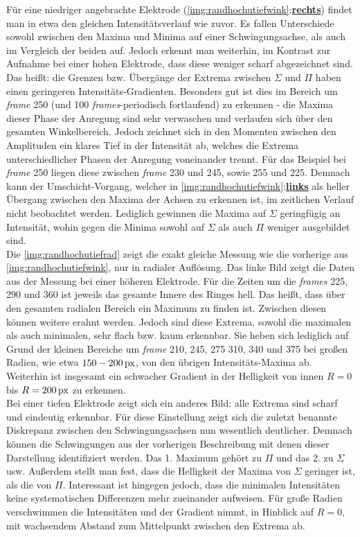 \documentclass[numbers=noenddot,a4paper,notitlepage,twoside,BCOR15mm]{scrbook}
\newcommand{\tilt}[1]{\textit{#1}}
\newcommand{\fett}[1]{\textbf{#1}}
\begin{document}
			Für eine niedriger angebrachte Elektrode (\autoref{img:randhochutiefwink}:\underline{\fett{rechts}}) findet man in etwa den gleichen Intensitätsverlauf wie zuvor. Es fallen Unterschiede sowohl zwischen den Maxima und Minima auf einer Schwingungsachse, als auch im Vergleich der beiden auf. Jedoch erkennt man weiterhin, im Kontrast zur Aufnahme bei einer hohen Elektrode, dass diese weniger scharf abgezeichnet sind. Das heißt: die Grenzen bzw. Übergänge der Extrema zwischen $\Sigma$ und $\Pi$ haben einen geringeren Intensitäts-Gradienten. Besonders gut ist dies im Bereich um \tilt{frame} 250 (und 100 \tilt{frames}-periodisch fortlaufend) zu erkennen - die Maxima dieser Phase der Anregung sind sehr verwaschen und verlaufen sich über den gesamten Winkelbereich. Jedoch zeichnet sich in den Momenten zwischen den Amplituden ein klares Tief in der Intensität ab, welches die Extrema unterschiedlicher Phasen der Anregung voneinander trennt. Für das Beispiel bei  \tilt{frame} 250 liegen diese zwischen \tilt{frame} 230 und 245, sowie 255 und 225. Demnach kann der Umschicht-Vorgang, welcher in \autoref{img:randhochutiefwink}:\underline{\fett{links}} als heller Übergang zwischen den Maxima der Achsen zu erkennen ist, im zeitlichen Verlauf nicht beobachtet werden. Lediglich gewinnen die Maxima auf $\Sigma$ geringfügig an Intensität, wohin gegen die Minima sowohl auf $\Sigma$ als auch $\Pi$ weniger ausgebildet sind.\\
			Die \autoref{img:randhochutiefrad} zeigt die exakt gleiche Messung wie die vorherige aus \autoref{img:randhochutiefwink}, nur in radialer Auflösung. Das linke Bild zeigt die Daten aus der Messung bei einer höheren Elektrode. Für die Zeiten um die \tilt{frames} 225, 290 und 360 ist jeweils das gesamte Innere des Ringes hell. Das heißt, dass über den gesamten radialen Bereich ein Maximum zu finden ist. Zwischen diesen können weitere erahnt werden. Jedoch sind diese Extrema, sowohl die maximalen als auch minimalen, sehr flach bzw. kaum erkennbar. Sie heben sich lediglich auf Grund der kleinen Bereiche um \tilt{frame} 210, 245, 275 310, 340 und 375 bei großen Radien, wie etwa $\unit[150-200]{px}$, von den übrigen Intensitäts-Maxima ab. Weiterhin ist insgesamt ein schwacher Gradient in der Helligkeit von innen $R=0$ bis $R=\unit[200]{px}$ zu erkennen.\\
			Bei einer tiefen Elektrode zeigt sich ein anderes Bild: alle Extrema sind scharf und eindeutig erkennbar. Für diese Einstellung zeigt sich die zuletzt benannte Diskrepanz zwischen den Schwingungsachsen nun wesentlich deutlicher. Demnach können die Schwingungen aus der vorherigen Beschreibung mit denen dieser Darstellung identifiziert werden. Das 1. Maximum gehört zu $\Pi$ und das 2. zu $\Sigma$ usw. Außerdem stellt man fest, dass die Helligkeit der Maxima von $\Sigma$ geringer ist, als die von $\Pi$. Interessant ist hingegen jedoch, dass die minimalen Intensitäten keine systematischen Differenzen mehr zueinander aufweisen. Für große Radien verschwimmen die Intensitäten und der Gradient nimmt, in Hinblick auf $R=0$, mit wachsendem Abstand zum Mittelpunkt zwischen den Extrema ab.
\end{document}
